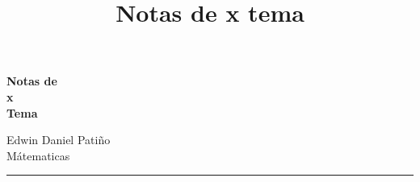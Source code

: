 \documentclass[12pt]{report}
\title{Notas de x tema}
\begin{document}
\begin{titlepage}
    \colorbox{primary}{
        \parbox[t]{0.93\textwidth}{
            \parbox[t]{0.91\textwidth}{
                \raggedleft
                \fontsize{50pt}{80pt}\selectfont
                \vspace{0.7cm}
                \textbf{
                    \color{white}
                    Notas de\\
                    x \\
                    Tema\\
                }
                \vspace{0.7cm}
            }
        }
    }

    \vfill


    \parbox[t]{0.93\textwidth}{ %
    \raggedleft %
    \large %
    {\Large Edwin Daniel Patiño}\\[4pt] %
    Mátematicas\\[4pt]
    {\color{primary}
    \hfill\rule{0.2\linewidth}{1pt}%
    }
    }

\end{titlepage}

\tableofcontents




\end{document}

